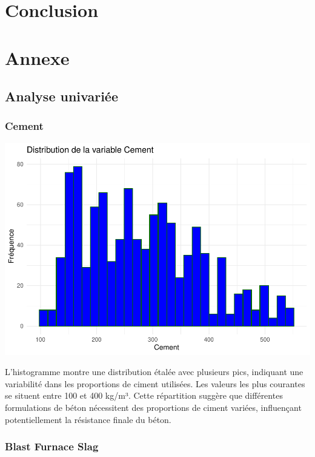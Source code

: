 \documentclass[
  12pt,
]{article}
\begin{document}
\section{Conclusion}\label{conclusion}

\section{Annexe}\label{annexe}

\subsection{Analyse univariée}\label{analyse-univariuxe9e}

\subsubsection{Cement}\label{cement}

\includegraphics{rmd_final_files/figure-latex/unnamed-chunk-1-1.pdf}

L'histogramme montre une distribution étalée avec plusieurs pics,
indiquant une variabilité dans les proportions de ciment utilisées. Les
valeurs les plus courantes se situent entre 100 et 400 kg/m³. Cette
répartition suggère que différentes formulations de béton nécessitent
des proportions de ciment variées, influençant potentiellement la
résistance finale du béton.

\subsubsection{Blast Furnace Slag}\label{blast-furnace-slag}
\end{document}
